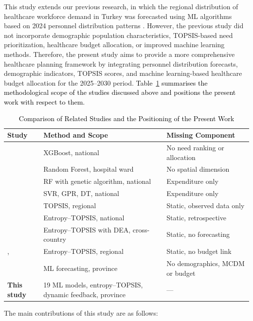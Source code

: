 \documentclass[final, 9pt, twocolumn]{saucis}
\newcommand{\rev}[1]{\textcolor{black}{#1}}
\begin{document}
This study extends our previous research, in which the regional distribution of healthcare workforce demand in Turkey was forecasted using ML algorithms based on 2024 personnel distribution patterns \cite{intro13}. However, the previous study did not incorporate demographic population characteristics, TOPSIS-based need prioritization, healthcare budget allocation, or improved machine learning methods. Therefore, the present study aims to provide a more comprehensive healthcare planning framework by integrating personnel distribution forecasts, demographic indicators, TOPSIS scores, and machine learning-based healthcare budget allocation for the 2025--2030 period. \rev{Table~\ref{tab:related_work} summarises the methodological scope of the studies discussed above and positions the present work with respect to them.}

\begin{table}[htbp]
\centering
\caption{\rev{Comparison of Related Studies and the Positioning of the Present Work}}
\label{tab:related_work}
\small
\begin{tabular}{p{1cm} p{3.3cm} p{3.0cm}}
\hline
\textbf{Study} & \textbf{Method and Scope} & \textbf{Missing Component} \\
\hline
\cite{intro8}  & XGBoost, national & No need ranking or allocation \\
\cite{intro9}  & Random Forest, hospital ward & No spatial dimension \\
\cite{intro11} & RF with genetic algorithm, national & Expenditure only \\
\cite{intro12} & SVR, GPR, DT, national & Expenditure only \\
\cite{intro10} & TOPSIS, regional & Static, observed data only \\
\cite{lit1}    & Entropy--TOPSIS, national & Static, retrospective \\
\cite{lit2}    & Entropy--TOPSIS with DEA, cross-country & Static, no forecasting \\
\cite{lit3}, \cite{lit6} & Entropy--TOPSIS, regional & Static, no budget link \\
\cite{intro13} & ML forecasting, province & No demographics, MCDM or budget \\
\hline
\textbf{This study} & 19 ML models, entropy--TOPSIS, dynamic feedback, province & --- \\
\hline
\end{tabular}
\end{table}

The main contributions of this study are as follows:
\end{document}
